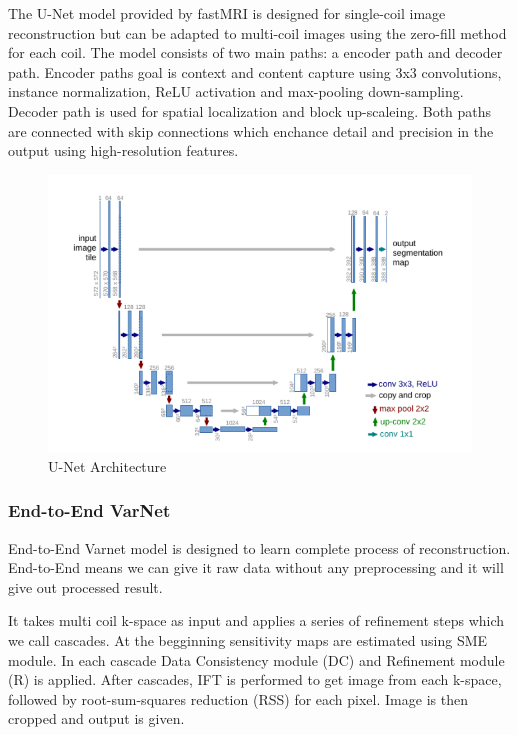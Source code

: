 \documentclass[10pt,a4paper]{article}
\begin{document}
The U-Net model provided by fastMRI is designed for single-coil image reconstruction but can be adapted to multi-coil images using the zero-fill method for each coil. The model consists of two main paths: a encoder path and decoder path. Encoder paths goal is context and content capture using 3x3 convolutions, instance normalization, ReLU activation and max-pooling down-sampling. Decoder path is used for spatial localization and block up-scaleing. Both paths are connected with skip connections which enchance detail and precision in the output using high-resolution features.

\begin{figure}[H]
\centering
\includegraphics[scale=0.5]{images/unet-architecture.png}
\caption{U-Net Architecture}
\end{figure}

\subsubsection{End-to-End VarNet}

End-to-End Varnet model is designed to learn complete process of reconstruction. End-to-End means we can give it raw data without any preprocessing and it will give out processed result.

It takes multi coil k-space as input and applies a series of refinement steps which we call cascades. At the begginning sensitivity maps are estimated using SME module. In each cascade Data Consistency module (DC) and Refinement module (R) is applied. After cascades, IFT is performed to get image from each k-space, followed by root-sum-squares reduction (RSS) for each pixel. Image is then cropped and output is given.
\end{document}
